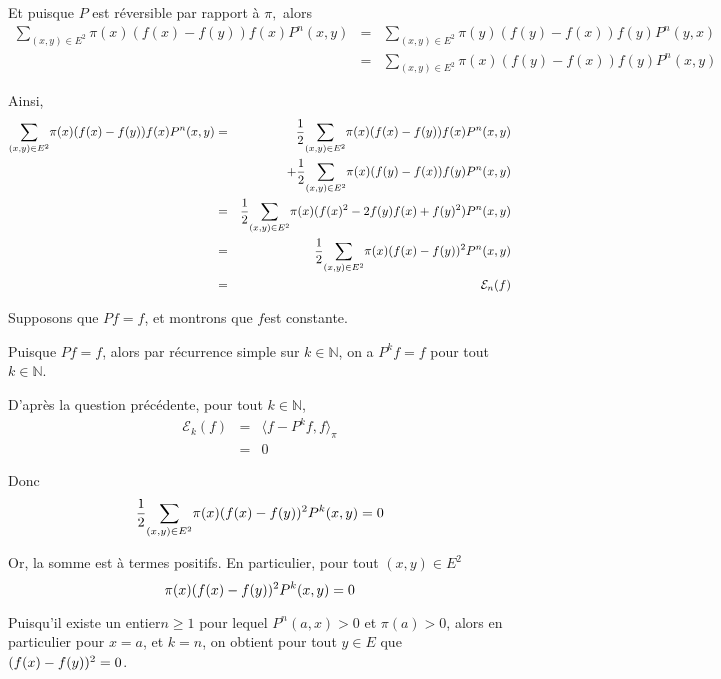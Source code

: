 Et puisque $P$ est r{\'e}versible par rapport {\`a} $\pi,$ alors
\begin{eqnarray*}
  \underset{(x, y) \in E^2}{\sum} \pi (x) (f (x) - f (y)) f (x) P^n (x, y) & =
  & \underset{(x, y) \in E^2}{\sum} \pi (y) (f (y) - f (x)) f (y) P^n (y, x)\\
  & = & \underset{(x, y) \in E^2}{\sum} \pi (x) (f (y) - f (x)) f (y) P^n (x,
  y)
\end{eqnarray*}

Ainsi,
\begin{eqnarray*}
  \underset{(x, y) \in E^2}{\sum} \pi (x) (f (x) - f (y)) f (x) P^n (x, y) & =
  & \frac{1}{2} \underset{(x, y) \in E^2}{\sum} \pi (x) (f (x) - f (y)) f (x)
  P^n (x, y)\\
  &  & + \frac{1}{2} \underset{(x, y) \in E^2}{\sum} \pi (x) (f (y) - f (x))
  f (y) P^n (x, y)\\
  & = & \frac{1}{2} \underset{(x, y) \in E^2}{\sum} \pi (x) (f (x)^2 - 2 f
  (y)  f (x) +  f (y)^2) P^n (x, y)\\
  & = & \frac{1}{2} \underset{(x, y) \in E^2}{\sum} \pi (x) (f (x)  -
    f (y))^2 P^n (x, y)\\
  & = & \mathcal{E}_n (f)
\end{eqnarray*}


{\hspace{3em}}

Supposons que $P f = f$, et montrons que $f$est constante.

Puisque $P f = f$, alors par r{\'e}currence simple sur $k \in \mathbb{N}$, on
a $P^k f = f$ pour tout $k \in \mathbb{N}$.

D'apr{\`e}s la question pr{\'e}c{\'e}dente, pour tout $k \in \mathbb{N}$,
\begin{eqnarray*}
  \mathcal{E}_k (f) & = & \langle f - P^k f, f \rangle_{\pi}\\
  & = & 0
\end{eqnarray*}


Donc
\[ \frac{1}{2} \underset{(x, y) \in E^2}{\sum} \pi (x) (f (x)  - 
    f (y))^2 P^k (x, y) = 0 \]


Or, la somme est {\`a} termes positifs. En particulier, pour tout $(x, y) \in
E^2$
\[ \pi (x) (f (x)  -   f (y))^2 P^k (x, y) = 0 \]


Puisqu'il existe un entier$n \geqslant 1$ pour lequel $P^n (a, x) > 0$ et $\pi
(a) > 0$, alors en particulier pour $x = a$, et $k = n$, on obtient pour tout
$y \in E$ que $(f (x)  -   f (y))^2 = 0$.

